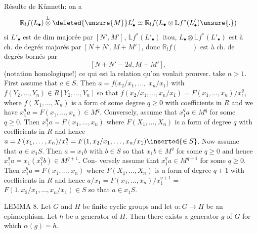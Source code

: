 Résulte  de Künneth: on a
\[
\mathbb R_!f(L_\bullet)\overset{\mathbb L}{\otimes}\deleted{\unsure{M}}L'_\bullet\simeq\mathbb R_!f(L_\bullet\otimes\mathbb Lf^*(L'_\bullet)\unsure{.})
\]
si
$L'_\bullet$ est de  dim majorée par $[N',M']$,
$\mathbb Lf^*(L'_\bullet)$ itou, $L_\bullet\otimes\mathbb Lf^*(L'_\bullet)$ est à ch. de
degrés majorés par $[N+N',M+M']$, donc
$\mathbb R_!f(\qquad)$ est à ch. de degrés bornés par
\[
[N+N'-2d,M+M'],
\]
(notation homologique!)
ce qui est la relation qu'on voulait prouver.
take $n>1$. First assume that $a\in S$. Then $a=f(x_2/x_1,\ldots,$
$x_n/x_1)$ with $f(Y_2,\ldots,Y_n)\in R[Y_2,\ldots,Y_n]$ so that
$f(x_2/x_1,\ldots,x_n/x_1)=F(x_1,\ldots,x_n)/x_1^q$, where $f(X_1,\ldots,X_n)$
is a form of some degree $q\ge0$ with coefficients in $R$ and
we have $x_1^q a=F(x_1,\ldots,x_n)\in M^q$. Conversely, assume that
$x_1^q a\in M^q$ for some $q\ge0$. Then $x_1^q a=F(x_1,\ldots,x_n)$ where
$F(X_1,\ldots,X_n)$ is a form of degree $q$ with coefficients in $R$
and hence $a=F(x_1,\ldots,x_n)/x_1^q=F(1,x_2/x_1,\ldots,x_n/x_1)\inserted{\in S}$. Now
assume that $a\in x_1S$. Then $a=x_1b$ with $b\in S$ so that
$x_1b\in M^q$ for some $q\ge0$ and hence $x_1^q a=x_1(x_1^q b)\in M^{q+1}$. Con-
versely assume that $x_1^q a\in M^{q+1}$ for some $q\ge0$. Then
$x_1^q a=F(x_1,\ldots,x_n)$ where $F(X_1,\ldots,X_n)$ is a form of degree
$q+1$ with coefficients in $R$ and hence $a/x_1=F(x_1,\ldots,x_n)/x_1^{q+1}=$
$F(1,x_2/x_1,\ldots,x_n/x_1)\in S$ so that $a\in x_1S$.

LEMMA 8. Let $G$ and $H$ be finite cyclic groups and
let $\alpha:G\longrightarrow H$ be an epimorphism. Let $h$ be a
generator of $H$. Then there exists a generator $g$ of
$G$ for which $\alpha(g)=h$.

